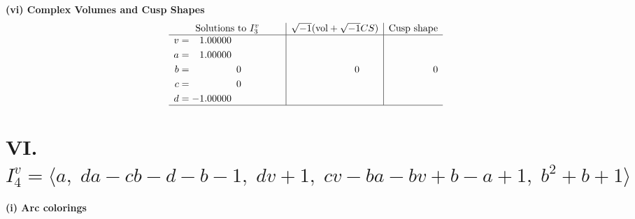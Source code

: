 \documentclass[1p]{elsarticle_modified}
\theoremstyle{definition}
\newcommand{\I}{\sqrt{-1}}
\begin{document}
\newpage\flushleft \textbf{(vi) Complex Volumes and Cusp Shapes}
$$\begin{array}{c|c|c}  
\text{Solutions to }I^v_{3}& \I (\text{vol} + \sqrt{-1}CS) & \text{Cusp shape}\\
 \hline 
\begin{aligned}
v &= \phantom{-}1.00000\phantom{ +0.000000I} \\
a &= \phantom{-}1.00000\phantom{ +0.000000I} \\
b &= \phantom{-0.000000 } 0 \\
c &= \phantom{-0.000000 } 0 \\
d &= -1.00000\phantom{ +0.000000I}\end{aligned}
 & \phantom{-0.000000 } 0 & \phantom{-0.000000 } 0\\
 \hline 
 \end{array}$$\newpage\newpage\renewcommand{\arraystretch}{1}
\centering \section*{VI. $I^v_{4}= \langle a,\;d a- c b- d- b-1,\;d v+1,\;c v- b a- b v+b- a+1,\;b^2+b+1 \rangle$}
\flushleft \textbf{(i) Arc colorings}\\
\end{document}
